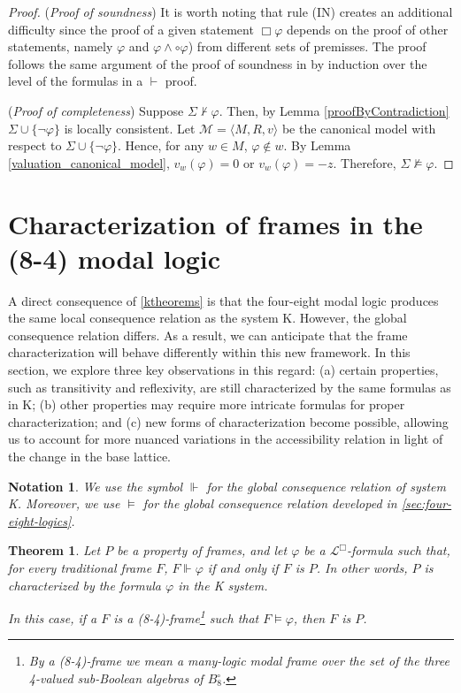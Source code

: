 \documentclass{amsart}
\newtheorem{theorem}{Theorem}[section]
\newtheorem{notation}{Notation}[section]
\newcommand{\pair}[1]{\langle #1 \rangle}
\newcommand{\cl}{\mathcal{L}}
\begin{document}
\begin{proof}
\quad

({\em Proof of soundness}) It is worth noting that rule (IN) creates an additional difficulty since the proof of a given statement $\Box \varphi$ depends on the proof of other
statements, namely $\varphi$ and $\varphi \wedge \circ \varphi$) from different sets of premisses. The proof follows the same argument of the proof of soundness in \cite{freire_modality_2024} by induction over the level of the formulas in a $\vdash$ proof.



({\em Proof of completeness}) Suppose $\Sigma \nvdash \varphi$. Then, by Lemma \ref{proofByContradiction} $\Sigma \cup \{\lnot \varphi\}$ is locally consistent. Let $\mathcal{M} = \pair{M, R, v}$ be the canonical model with respect to $\Sigma \cup \{\lnot \varphi\}$. Hence, for any $w\in M$, $\varphi\notin w$. By Lemma \ref{valuation_canonical_model}, $v_w(\varphi)=0$ or $v_w(\varphi)=-z$. Therefore, $\Sigma \not \vDash \varphi$.
\end{proof}




\section{Characterization of frames in the (8-4) modal logic}\label{sec_prop}

A direct consequence of \cref{ktheorems} is that the four-eight modal logic produces the same local consequence relation as the system K. However, the global consequence relation differs. As a result, we can anticipate that the frame characterization will behave differently within this new framework. In this section, we explore three key observations in this regard: (a) certain properties, such as transitivity and reflexivity, are still characterized by the same formulas as in K; (b) other properties may require more intricate formulas for proper characterization; and (c) new forms of characterization become possible, allowing us to account for more nuanced variations in the accessibility relation in light of the change in the base lattice.

\begin{notation}
    We use the symbol $\Vdash$ for the global consequence relation of system K. Moreover, we use $\vDash$ for the global consequence relation developed in \cref{sec:four-eight-logics}.
\end{notation}

\begin{theorem}\label{one-direction-preservation}
    Let $P$ be a property of frames, and let $\varphi$ be a $\cl^\Box$-formula such that, for every traditional frame $F$, $F \Vdash \varphi$ if and only if $F$ is $P$. In other words, $P$ is characterized by the formula $\varphi$ in the K system.
    
    In this case, if a $F$ is a (8-4)-frame\footnote{By a (8-4)-frame we mean a many-logic modal frame over the set of the three 4-valued sub-Boolean algebras of $B_8^\circ$.} such that $F \vDash \varphi$, then $F$ is $P$.
\end{theorem}
\end{document}
